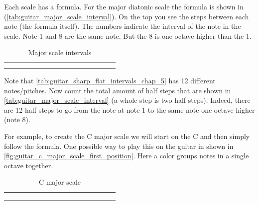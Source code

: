 Each scale has a formula. For the major diatonic scale the formula is shown in (\autoref{tab:guitar_major_scale_interval}). On the top you see the steps between each note (the formula itself). The numbers indicate the interval of the note in the scale. Note 1 and 8 are the same note. But the 8 is one octave higher than the 1.

\begin{table}[h]
	\centering
	\begin{NiceTabular}{*{16}{P{0.05mm}}}
		\Block{}{} &  & &  & &  & &  & &  & &  & &  & & \Block{}{} \\
		 & &  & &  & &  & &  & &  & &  & &  &
	\end{NiceTabular}
	\caption{Major scale intervals}
	\label{tab:guitar_major_scale_interval}
\end{table}

Note that \autoref{tab:guitar_sharp_flat_intervals_chap_5} has 12 different notes/pitches. Now count the total amount of half steps that are shown in \autoref{tab:guitar_major_scale_interval} (a whole step is two half steps). Indeed, there are 12 half steps to go from the note at note 1 to the same note one octave higher (note 8).

For example, to create the C major scale we will start on the C and then simply follow the formula. One possible way to play this on the guitar in shown in \autoref{fig:guitar_c_major_scale_first_position}. Here a color groups notes in a single octave together.

\begin{table}[h]
	\centering
	\begin{NiceTabular}{*{16}{P{0.05mm}}}
		\Block{}{} &  & &  & &  & &  & &  & &  & &  & & \Block{}{} \\
		 & &  & &  & &  & &  & &  & &  & &  & \\
		 & &  & &  & &  & &  & &  & &  & &  & 
	\end{NiceTabular}
	\caption{C major scale}
	\label{tab:guitar_c_major_scale}
\end{table}

